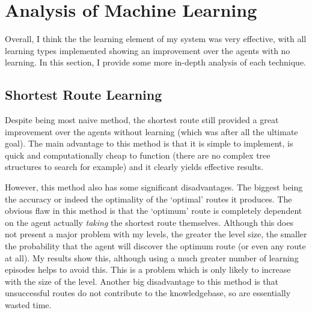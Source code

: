 \documentclass[a4paper,oneside]{report}
\begin{document}
\section{Analysis of Machine Learning}

Overall, I think the the learning element of my system was very effective, with all learning types implemented showing an improvement over the agents with no learning. In this section, I provide some more in-depth analysis of each technique.

\subsection{Shortest Route Learning}

Despite being most naive method, the shortest route still provided a great improvement over the agents without learning (which was after all the ultimate goal). The main advantage to this method is that it is simple to implement, is quick and computationally cheap to function (there are no complex tree structures to search for example) and it clearly yields effective results. 

However, this method also has some significant disadvantages. The biggest being the accuracy or indeed the optimality of the `optimal' routes it produces. The obvious flaw in this method is that the `optimum' route is completely dependent on the agent actually \emph{taking} the shortest route themselves. Although this does not present a major problem with my levels, the greater the level size, the smaller the probability that the agent will discover the optimum route (or even any route at all). My results show this, although using a much greater number of learning episodes helps to avoid this. This is a problem which is only likely to increase with the size of the level. Another big disadvantage to this method is that unsuccessful routes do not contribute to the knowledgebase, so are essentially wasted time. 
\end{document}
